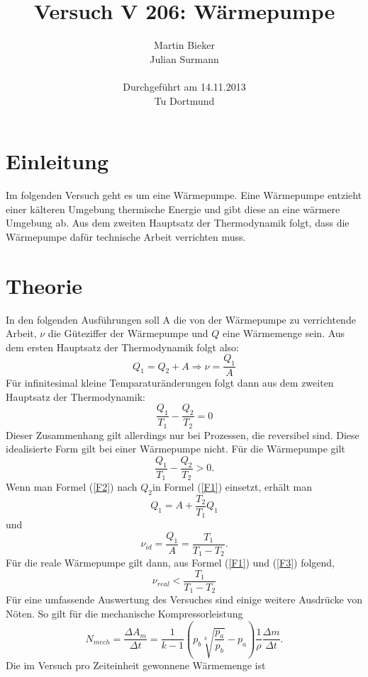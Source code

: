 \documentclass[11pt]{article}
\title{\textbf{Versuch V 206: Wärmepumpe}}
\author{Martin Bieker\\
		Julian Surmann\\
		\\
		Durchgef\"{u}hrt am 14.11.2013\\
		Tu Dortmund}
\date{}
\begin{document}
\renewcommand\tablename{Tabelle}
\renewcommand\figurename{Abbildung}
\maketitle
\thispagestyle{empty}
\newpage
\clearpage
\setcounter{page}{1}


\section{Einleitung}
Im folgenden Versuch geht es um eine Wärmepumpe. Eine Wärmepumpe entzieht einer kälteren Umgebung thermische Energie und gibt diese an eine wärmere Umgebung ab. Aus dem zweiten Hauptsatz der Thermodynamik folgt, dass die Wärmepumpe dafür technische Arbeit verrichten muss.
\section{Theorie}
In den folgenden Ausführungen soll A die von der Wärmepumpe zu verrichtende Arbeit, $\nu$ die Güteziffer der Wärmepumpe und $Q$ eine Wärmemenge sein. Aus dem ersten Hauptsatz der Thermodynamik folgt also:
\begin{equation}
\label{F1}
Q_1 = Q_2 + A \Rightarrow \nu = \frac{Q_1}{A}
\end{equation}
Für infinitesimal kleine Temparaturänderungen folgt dann aus dem zweiten Hauptsatz der Thermodynamik:
\begin{equation}
\label{F2}
\frac{Q_1}{T_1} - \frac{Q_2}{T_2} = 0
\end{equation}
Dieser Zusammenhang gilt allerdings nur bei Prozessen, die reversibel sind. Diese idealisierte Form gilt bei einer Wärmepumpe nicht. Für die Wärmepumpe gilt
\begin{equation}
\label{F3}
\frac{Q_1}{T_1} - \frac{Q_2}{T_2} > 0.
\end{equation}
Wenn man Formel (\ref{F2}) nach $Q_2$in Formel (\ref{F1}) einsetzt, erhält man
\begin{equation}
\label{F4}
Q_1 = A + \frac{T_2}{T_1} Q_1
\end{equation}
und
\begin{equation}
\label{F5}
\nu_{id} = \frac{Q_1}{A} = \frac{T_1}{T_1-T_2}.
\end{equation}
Für die reale Wärmepumpe gilt dann, aus Formel (\ref{F1}) und (\ref{F3}) folgend,
\begin{equation}
\label{F6}
\nu_{real} < \frac{T_1}{T_1-T_2}
\end{equation}
Für eine umfassende Auswertung des Versuches sind einige weitere Ausdrücke von Nöten.
So gilt für die mechanische Kompressorleistung
\begin{equation}
\label{F7}
N_{mech} = \frac{\Delta A_m}{\Delta t} = \frac{1}{k-1} \left(p_b \sqrt[k]{\frac{p_a}{p_b}}-p_a \right) \frac{1}{\rho} \frac{\Delta m}{\Delta t}.
\end{equation}
Die im Versuch pro Zeiteinheit gewonnene Wärmemenge ist
\begin{equation}
\label{F8}

\end{equation}
\end{document}

